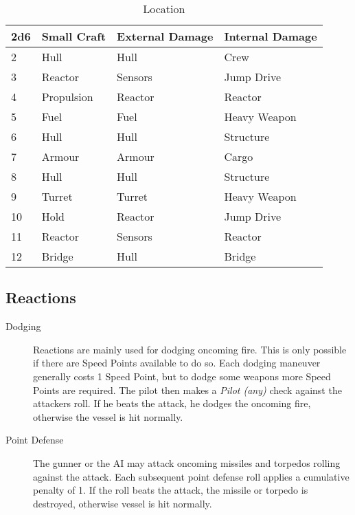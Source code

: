 \begin{table}[H]
  \centering
  \caption{Location}
  \label{tab:vessel-location}
    \begin{tabular}{|l|l|l|l|}
    \hline
    2d6 & Small Craft & External Damage & Internal Damage \\ \hline
    2   & Hull        & Hull            & Crew            \\ \hline
    3   & Reactor     & Sensors         & Jump Drive      \\ \hline
    4   & Propulsion  & Reactor         & Reactor         \\ \hline
    5   & Fuel        & Fuel            & Heavy Weapon    \\ \hline
    6   & Hull        & Hull            & Structure       \\ \hline
    7   & Armour      & Armour          & Cargo           \\ \hline
    8   & Hull        & Hull            & Structure       \\ \hline
    9   & Turret      & Turret          & Heavy Weapon    \\ \hline
    10  & Hold        & Reactor         & Jump Drive      \\ \hline
    11  & Reactor     & Sensors         & Reactor         \\ \hline
    12  & Bridge      & Hull            & Bridge          \\ \hline
    \end{tabular}
\end{table}

\subsection{Reactions}
\label{sub:Reactions}

\begin{description}
  \item[Dodging]
  Reactions are mainly used for dodging oncoming fire. This is only possible if there are Speed Points available to do so. Each dodging maneuver generally costs 1 Speed Point, but to dodge some weapons more Speed Points are required. The pilot then makes a \emph{Pilot (any)} check against the attackers roll. If he beats the attack, he dodges the oncoming fire, otherwise the vessel is hit normally.
  \item[Point Defense]
  The gunner or the AI may attack oncoming missiles and torpedos rolling against the attack. Each subsequent point defense roll applies a cumulative penalty of 1. If the roll beats the attack, the missile or torpedo is destroyed, otherwise vessel is hit normally.
\end{description}
